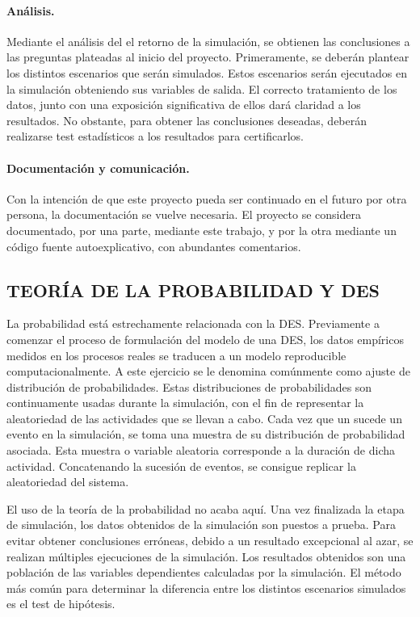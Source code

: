 \paragraph{Análisis.}

Mediante el análisis del el retorno de la simulación,
se obtienen las conclusiones a las preguntas plateadas al inicio del proyecto.
Primeramente, se deberán plantear los distintos escenarios que serán simulados.
Estos escenarios serán ejecutados en la simulación
obteniendo sus variables de salida.
El correcto tratamiento de los datos,
junto con una exposición significativa de ellos dará claridad a los resultados.
No obstante, para obtener las conclusiones deseadas,
deberán realizarse test estadísticos a los resultados para certificarlos.

\paragraph{Documentación y comunicación.}

Con la intención de que este proyecto
pueda ser continuado en el futuro por otra persona,
la documentación se vuelve necesaria.
El proyecto se considera documentado,
por una parte, mediante este trabajo,
y por la otra mediante un código fuente autoexplicativo,
con abundantes comentarios.

\subsection{TEORÍA DE LA PROBABILIDAD Y DES}

La probabilidad está estrechamente relacionada con la DES.
Previamente a comenzar el proceso de formulación del modelo de una DES,
los datos empíricos medidos en los procesos reales
se traducen a un modelo reproducible computacionalmente.
A este ejercicio se le denomina comúnmente como
ajuste de distribución de probabilidades.
Estas distribuciones de probabilidades son
continuamente usadas durante la simulación,
con el fin de representar la aleatoriedad de
las actividades que se llevan a cabo.
Cada vez que un sucede un evento en la simulación,
se toma una muestra de su distribución de probabilidad asociada.
Esta muestra o variable aleatoria corresponde a la duración de dicha actividad.
Concatenando la sucesión de eventos,
se consigue replicar la aleatoriedad del sistema.

El uso de la teoría de la probabilidad no acaba aquí.
Una vez finalizada la etapa de simulación,
los datos obtenidos de la simulación son puestos a prueba.
Para evitar obtener conclusiones erróneas,
debido a un resultado excepcional al azar,
se realizan múltiples ejecuciones de la simulación.
Los resultados obtenidos son una población de
las variables dependientes calculadas por la simulación.
El método más común para determinar la diferencia
entre los distintos escenarios simulados es el test de hipótesis.

